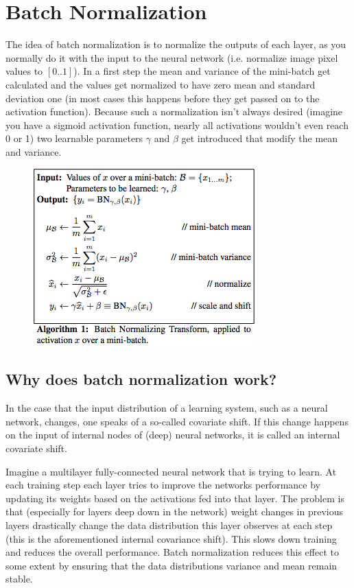 \documentclass{scrartcl}
\begin{document}
\section{Batch Normalization}
The idea of batch normalization is to normalize the outputs of each layer, as you normally do it with the input to the neural network (i.e. normalize image pixel values to $[0..1]$). In a first step the mean and variance of the mini-batch get calculated and the values get normalized to have zero mean and standard deviation one (in most cases this happens before they get passed on to the activation function). Because such a normalization isn't always desired (imagine you have a sigmoid activation function, nearly all activations wouldn't even reach 0 or 1) two learnable parameters $\gamma$ and $\beta$ get introduced that modify the mean and variance.
\begin{figure}
	\centering
		\includegraphics[scale=0.7]{img/batch_norm}
	\caption{}
	\label{fig:batch_norm}
\end{figure}

\subsection{Why does batch normalization work?}
In the case that the input distribution of a learning system, such as a neural network, changes, one speaks of a so-called covariate shift. If this change happens on the input of internal nodes of (deep) neural networks, it is called an internal covariate shift.

Imagine a multilayer fully-connected neural network that is trying to learn. At each training step each layer tries to improve the networks performance by updating its weights based on the activations fed into that layer. The problem is that (especially for layers deep down in the network) weight changes in previous layers drastically change the data distribution this layer observes at each step (this is the aforementioned internal covariance shift). This slows down training and reduces the overall performance. Batch normalization reduces this effect to some extent by ensuring that the data distributions variance and mean remain stable.
\end{document}
